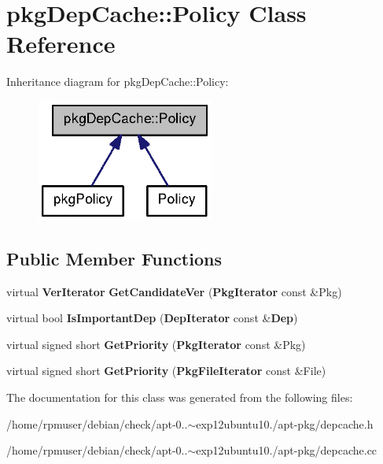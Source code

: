 \section{pkg\-Dep\-Cache\-:\-:\-Policy \-Class \-Reference}
\label{classpkgDepCache_1_1Policy}


\-Inheritance diagram for pkg\-Dep\-Cache\-:\-:\-Policy\-:
\nopagebreak
\begin{figure}[H]
\begin{center}
\leavevmode
\includegraphics[width=166pt]{classpkgDepCache_1_1Policy__inherit__graph}
\end{center}
\end{figure}
\subsection*{\-Public \-Member \-Functions}
\begin{DoxyCompactItemize}
\item 
virtual {\bf \-Ver\-Iterator} {\bfseries \-Get\-Candidate\-Ver} ({\bf \-Pkg\-Iterator} const \&\-Pkg)\label{classpkgDepCache_1_1Policy_a98078e7bb160c136f3b4fb1bd5fde36e}

\item 
virtual bool {\bfseries \-Is\-Important\-Dep} ({\bf \-Dep\-Iterator} const \&{\bf \-Dep})\label{classpkgDepCache_1_1Policy_abec8ff6462cd8e729dcadf1014871d84}

\item 
virtual signed short {\bfseries \-Get\-Priority} ({\bf \-Pkg\-Iterator} const \&\-Pkg)\label{classpkgDepCache_1_1Policy_a12b8f4631ff7d03fbc474a0764b95f06}

\item 
virtual signed short {\bfseries \-Get\-Priority} ({\bf \-Pkg\-File\-Iterator} const \&\-File)\label{classpkgDepCache_1_1Policy_a2b1c46b074def06ea63fedc78a268cf8}

\end{DoxyCompactItemize}


\-The documentation for this class was generated from the following files\-:\begin{DoxyCompactItemize}
\item 
/home/rpmuser/debian/check/apt-\/0..$\sim$exp12ubuntu10./apt-\/pkg/depcache.\-h\item 
/home/rpmuser/debian/check/apt-\/0..$\sim$exp12ubuntu10./apt-\/pkg/depcache.\-cc\end{DoxyCompactItemize}

